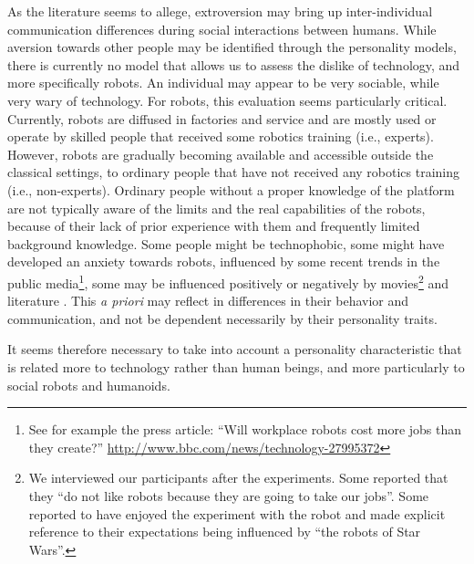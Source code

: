 As the literature seems to allege, extroversion may bring up inter-individual communication differences during social interactions between humans. While aversion towards other people may be identified through the personality models, there is currently no model that allows us to assess the dislike of technology, and more specifically robots. An individual may appear to be very sociable, while very wary of technology. 
For robots, this evaluation seems particularly critical. Currently, robots are diffused in factories and service and are mostly used or operate by skilled people that received some robotics training (i.e., experts). However, robots are gradually becoming available and accessible outside the classical settings, to ordinary people that have not received any robotics training (i.e., non-experts). Ordinary people without a proper knowledge of the platform are not typically aware of the limits and the real capabilities of the robots, because of their lack of prior experience with them and frequently limited background knowledge. 
Some people might be technophobic, some might have developed an anxiety towards robots, influenced by some recent trends in the public media\footnote{See for example the press article: ``Will workplace robots cost more jobs than they create?'' \url{http://www.bbc.com/news/technology-27995372}}, some may be influenced positively or negatively by movies\footnote{We interviewed our participants after the experiments. Some reported that they ``do not like robots because they are going to take our jobs''. Some reported to have enjoyed the experiment with the robot and made explicit reference to their expectations being influenced by ``the robots of Star Wars''.} and literature \cite{Mara2015}. This \textit{a priori} may reflect in differences in their behavior and communication, and not be dependent necessarily by their personality traits.

It seems therefore necessary to take into account a personality characteristic that is related more to technology rather than human beings, and more particularly to social robots and humanoids.

